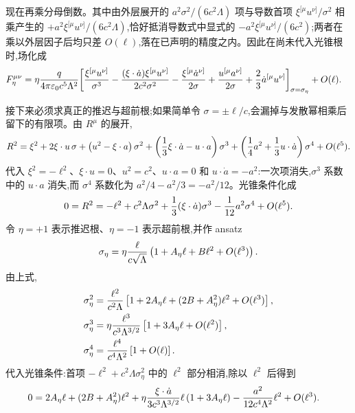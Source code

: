现在再乘分母倒数。其中由外层展开的 $a^2\sigma^2/(6c^2\Lambda)$ 项与导数首项 $\xi^{[\mu}u^{\nu]}/\sigma^2$ 相乘产生的 $+a^2\xi^{[\mu}u^{\nu]}/(6c^2\Lambda)$,恰好抵消导数式中显式的 $-a^2\xi^{[\mu}u^{\nu]}/(6c^2)$;两者在乘以外层因子后均只差 $O(\ell)$,落在已声明的精度之内。因此在尚未代入光锥根时,场化成
\begin{align*}
 F_\eta^{\mu\nu}
 =\eta{q\over4\pi\varepsilon_0c^5\Lambda^2}
 \bigg[{}&
 {\xi^{[\mu}u^{\nu]}\over\sigma^3}
 -{(\xi\cdot\dot a)\xi^{[\mu}u^{\nu]}\over2c^2\sigma^2}
 -{\xi^{[\mu}\dot a^{\nu]}\over2\sigma}
 +{u^{[\mu}a^{\nu]}\over2\sigma}
 +{2\over3}\dot a^{[\mu}u^{\nu]}
 \bigg]_{\sigma=\sigma_\eta}
 +O(\ell).
\end{align*}

接下来必须求真正的推迟与超前根;如果简单令 $\sigma=\pm\ell/c$,会漏掉与发散幂相乘后留下的有限项。由 $R^\mu$ 的展开,
\begin{equation*}
 R^2
 =\xi^2+2\xi\cdot u\,\sigma
 +\left(u^2-\xi\cdot a\right)\sigma^2
 +\left({1\over3}\xi\cdot\dot a-u\cdot a\right)\sigma^3
 +\left({1\over4}a^2+{1\over3}u\cdot\dot a\right)\sigma^4
 +O(\ell^5).
\end{equation*}
代入 $\xi^2=-\ell^2$、$\xi\cdot u=0$、$u^2=c^2$、$u\cdot a=0$ 和 $u\cdot\dot a=-a^2$:一次项消失,$\sigma^3$ 系数中的 $u\cdot a$ 消失,而 $\sigma^4$ 系数化为 $a^2/4-a^2/3=-a^2/12$。光锥条件化成
\begin{equation*}
 0=R^2
 =-\ell^2+c^2\Lambda\sigma^2
 +{1\over3}(\xi\cdot\dot a)\sigma^3
 -{1\over12}a^2\sigma^4
 +O(\ell^5).
\end{equation*}
令 $\eta=+1$ 表示推迟根、$\eta=-1$ 表示超前根,并作 ansatz
\begin{equation*}
 \sigma_\eta
 =\eta{\ell\over c\sqrt{\Lambda}}
 \left(1+A_\eta\ell+B\ell^2+O(\ell^3)\right).
\end{equation*}
由上式,
\begin{align*}
 \sigma_\eta^2
 &={\ell^2\over c^2\Lambda}
 \left[1+2A_\eta\ell+(2B+A_\eta^2)\ell^2+O(\ell^3)\right],\\
 \sigma_\eta^3
 &=\eta{\ell^3\over c^3\Lambda^{3/2}}
 \left[1+3A_\eta\ell+O(\ell^2)\right],\\
 \sigma_\eta^4
 &={\ell^4\over c^4\Lambda^2}
 \left[1+O(\ell)\right].
\end{align*}
代入光锥条件:首项 $-\ell^2+c^2\Lambda\sigma_\eta^2$ 中的 $\ell^2$ 部分相消,除以 $\ell^2$ 后得到
\begin{align*}
 0={}&2A_\eta\ell
 +(2B+A_\eta^2)\ell^2
 +\eta{\xi\cdot\dot a\over3c^3\Lambda^{3/2}}\ell
 \left(1+3A_\eta\ell\right)
 -{a^2\over12c^4\Lambda^2}\ell^2
 +O(\ell^3).
\end{align*}
